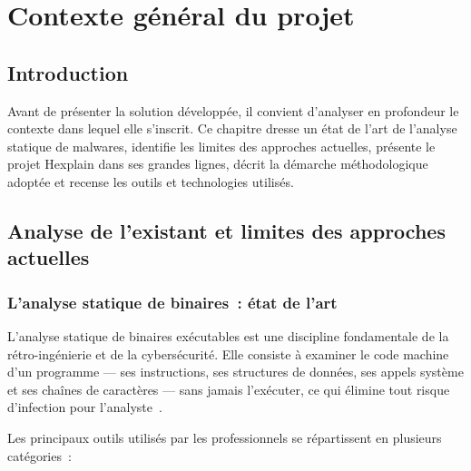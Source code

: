 
\chapter{Contexte général du projet}

\section{Introduction}

Avant de présenter la solution développée, il convient d'analyser en profondeur le contexte dans lequel elle s'inscrit. Ce chapitre dresse un état de l'art de l'analyse statique de malwares, identifie les limites des approches actuelles, présente le projet Hexplain dans ses grandes lignes, décrit la démarche méthodologique adoptée et recense les outils et technologies utilisés.

\section{Analyse de l'existant et limites des approches actuelles}

\subsection{L'analyse statique de binaires~: état de l'art}

L'analyse statique de binaires exécutables est une discipline fondamentale de la rétro-ingénierie et de la cybersécurité. Elle consiste à examiner le code machine d'un programme --- ses instructions, ses structures de données, ses appels système et ses chaînes de caractères --- sans jamais l'exécuter, ce qui élimine tout risque d'infection pour l'analyste~\cite{sikorski2012practical}.

Les principaux outils utilisés par les professionnels se répartissent en plusieurs catégories~:


